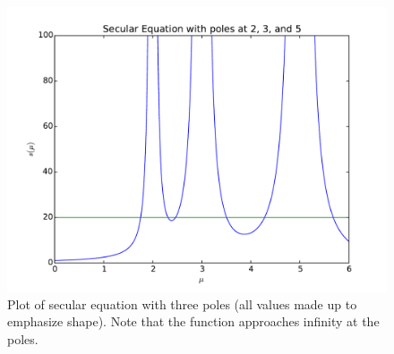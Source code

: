 \documentclass[conference]{IEEEtran}
\begin{document}
\begin{figure}
\centering
\includegraphics[width=0.9\linewidth]{../images/secular}
\caption{Plot of secular equation with three poles (all values made up to emphasize shape). Note that the function approaches infinity at the poles.}
\label{fig:secular}
\end{figure}






%

%


\end{document}
